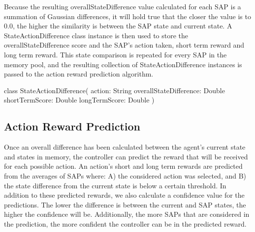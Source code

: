 Because the resulting overallStateDifference value calculated for each SAP is a summation of Gaussian differences, it will hold true that the closer the value is to 0.0, the higher the similarity is between the SAP state and current state.
A StateActionDifference class instance is then used to store the overallStateDifference score and the SAP's action taken, short term reward and long term reward.
This state comparison is repeated for every SAP in the memory pool, and the resulting collection of StateActionDifference instances is passed to the action reward prediction algorithm.

\begin{listings}
class StateActionDifference(
  action: String
  overallStateDifference: Double
  shortTermScore: Double
  longTermScore: Double
)
\end{listings}



\subsection{Action Reward Prediction}
Once an overall difference has been calculated between the agent's current state and states in memory, the controller can predict the reward that will be received for each possible action.
An action's short and long term rewards are predicted from the averages of SAPs where: A) the considered action was selected, and B) the state difference from the current state is below a certain threshold.
In addition to these predicted rewards, we also calculate a confidence value for the predictions.
The lower the difference is between the current and SAP states, the higher the confidence will be.
Additionally, the more SAPs that are considered in the prediction, the more confident the controller can be in the predicted reward.
